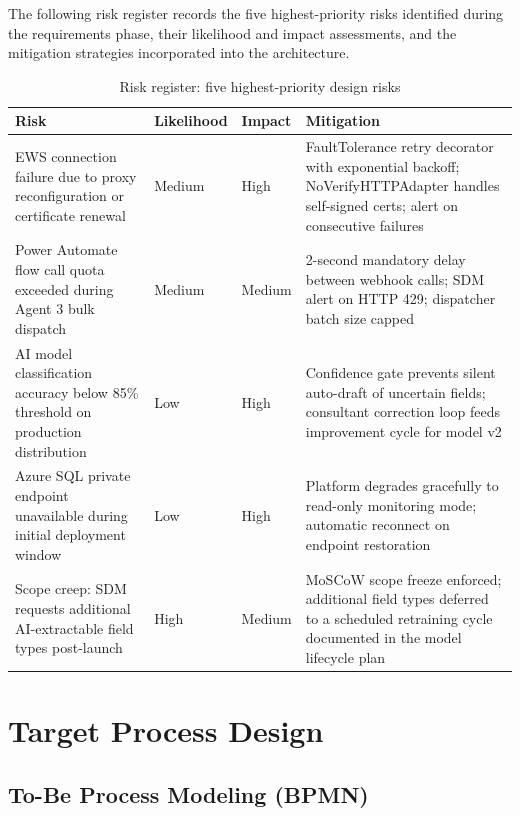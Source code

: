 The following risk register records the five highest-priority risks identified during the requirements phase, their likelihood and impact assessments, and the mitigation strategies incorporated into the architecture.

\begin{table}[H]
  \centering
  \caption{Risk register: five highest-priority design risks}
  \renewcommand{\arraystretch}{1.0}
  \footnotesize
  \begin{tabularx}{\textwidth}{|X|X|X|X|}
    \hline
    \textbf{Risk} & \textbf{Likelihood} & \textbf{Impact} & \textbf{Mitigation} \\ \hline
    EWS connection failure due to proxy reconfiguration or certificate renewal & Medium & High & FaultTolerance retry decorator with exponential backoff; NoVerifyHTTPAdapter handles self-signed certs; alert on consecutive failures \\ \hline
    Power Automate flow call quota exceeded during Agent 3 bulk dispatch & Medium & Medium & 2-second mandatory delay between webhook calls; SDM alert on HTTP 429; dispatcher batch size capped \\ \hline
    AI model classification accuracy below 85\% threshold on production distribution & Low & High & Confidence gate prevents silent auto-draft of uncertain fields; consultant correction loop feeds improvement cycle for model v2 \\ \hline
    Azure SQL private endpoint unavailable during initial deployment window & Low & High & Platform degrades gracefully to read-only monitoring mode; automatic reconnect on endpoint restoration \\ \hline
    Scope creep: SDM requests additional AI-extractable field types post-launch & High & Medium & MoSCoW scope freeze enforced; additional field types deferred to a scheduled retraining cycle documented in the model lifecycle plan \\ \hline
  \end{tabularx}
\end{table}

\section{Target Process Design}

\subsection{To-Be Process Modeling (BPMN)}

